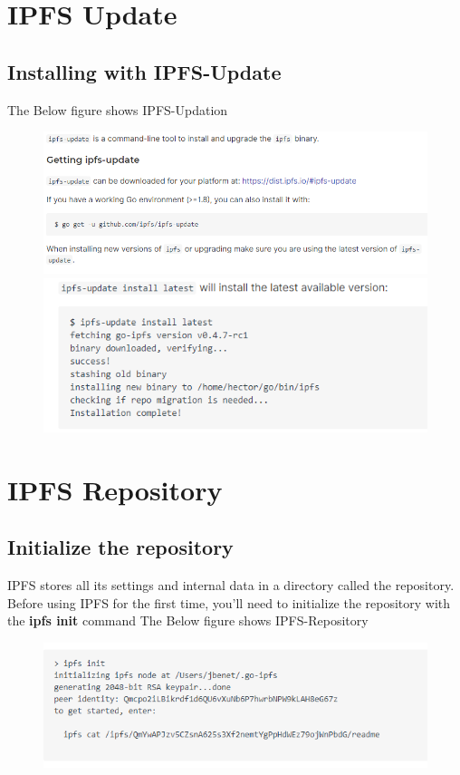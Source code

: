 \section{IPFS Update}
\subsection{Installing with IPFS-Update}
The Below figure shows IPFS-Updation
\begin{figure}[h]
	\centering
	\includegraphics[width=450px]{figures/IPFS/02.png}
	\includegraphics[width=450px]{figures/IPFS/04.png}
	
\end{figure}

\section{IPFS Repository}
\subsection{Initialize the repository}
IPFS stores all its settings and internal data in a directory called the repository. Before using IPFS for the first time, you’ll need to initialize the repository with the \textbf{ ipfs init} command The Below figure shows IPFS-Repository
\begin{figure}[h]
	\centering
	\includegraphics[width=450px]{figures/IPFS/05.png}
\end{figure}

